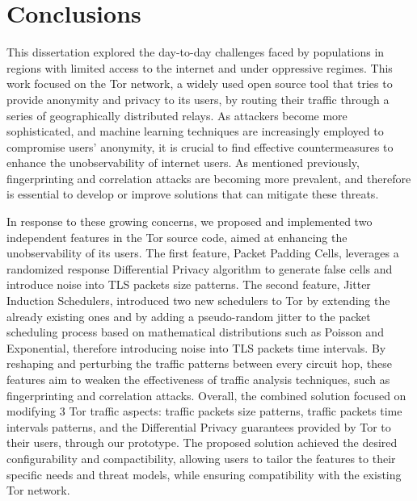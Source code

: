 
%

\chapter{Conclusions}\label{cha:conclusions}

This dissertation explored the day-to-day challenges faced by populations in regions with limited access to the internet and under oppressive regimes. This work focused on the Tor network, a widely used open source tool that tries to provide anonymity and privacy to its users, by routing their traffic through a series of geographically distributed relays. As attackers become more sophisticated, and machine learning techniques are increasingly employed to compromise users' anonymity, it is crucial to find effective countermeasures to enhance the unobservability of internet users. As mentioned previously, fingerprinting and correlation attacks are becoming more prevalent, and therefore is essential to develop or improve solutions that can mitigate these threats.

In response to these growing concerns, we proposed and implemented two independent features in the Tor source code, aimed at enhancing the unobservability of its users. The first feature, Packet Padding Cells, leverages a randomized response Differential Privacy algorithm to generate false cells and introduce noise into TLS packets size patterns. The second feature, Jitter Induction Schedulers, introduced two new schedulers to Tor by extending the already existing ones and by adding a pseudo-random jitter to the packet scheduling process based on mathematical distributions such as Poisson and Exponential, therefore introducing noise into TLS packets time intervals. By reshaping and perturbing the traffic patterns between every circuit hop, these features aim to weaken the effectiveness of traffic analysis techniques, such as fingerprinting and correlation attacks. Overall, the combined solution focused on modifying 3 Tor traffic aspects: traffic packets size patterns, traffic packets time intervals patterns, and the Differential Privacy guarantees provided by Tor to their users, through our prototype. The proposed solution achieved the desired configurability and compactibility, allowing users to tailor the features to their specific needs and threat models, while ensuring compatibility with the existing Tor network.

